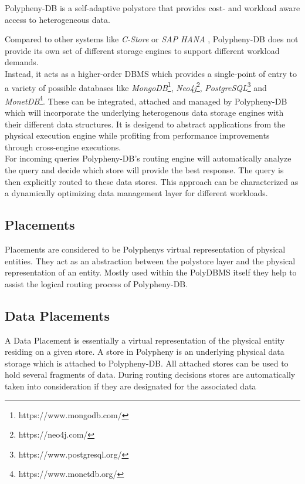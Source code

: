 Polypheny-DB is a self-adaptive polystore that provides cost- and workload aware access to heterogeneous data\cite{poly2020}.

Compared to other systems like \textit{C-Store}\cite{cstore_2005} or \textit{SAP HANA} \cite{hana_2012}, 
Polypheny-DB does not provide its own set of different storage engines to support 
different workload demands.\\
Instead, it acts as a higher-order DBMS which provides a single-point of entry to 
a variety of possible databases like 
\textit{MongoDB}\footnote{https://www.mongodb.com/}, 
\textit{Neo4j}\footnote{https://neo4j.com/},
\textit{PostgreSQL}\footnote{https://www.postgresql.org/} 
and \textit{MonetDB}\footnote{https://www.monetdb.org/}. 
These can be integrated, attached and managed by Polypheny-DB which will incorporate the underlying 
heterogenous data storage engines with their different data structures. 
It is desigend to abstract applications from the physical execution engine while profiting from 
performance improvements through cross-engine executions. 
\\
For incoming queries Polypheny-DB's routing engine will automatically analyze the query and decide 
which store will provide the best response. The query is then explicitly routed to these data stores. 
This approach can be characterized as a dynamically optimizing data management layer for different workloads.



\subsection{Placements}
Placements are considered to be Polyphenys virtual representation of physical entities.
They act as an abstraction between the polystore layer and the physical representation of an entity. 
Mostly used within the PolyDBMS itself they help to assist the logical routing process of Polypheny-DB.



\subsection{Data Placements}

A Data Placement is essentially a virtual representation of the physical entity residing on a given store.
A store in Polypheny is an underlying physical data storage which is 
attached to Polypheny-DB.
All attached stores can be used to hold several fragments of data. 
During routing decisions stores are automatically taken into consideration if they are designated for the associated data 

